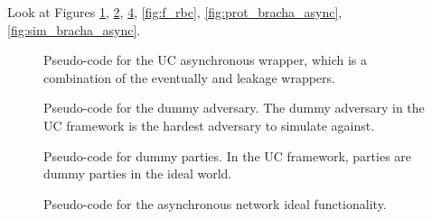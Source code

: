 %


Look at Figures \ref{fig:wrapper_async_new}, \ref{fig:dummy_adversary}, \ref{fig:f_async_explicit}, \ref{fig:f_rbc}, \ref{fig:prot_bracha_async}, \ref{fig:sim_bracha_async}.

\begin{figure}[h]
\centering
	
	\caption{Pseudo-code for the UC asynchronous wrapper, which is a combination of the eventually and leakage wrappers.}
	\label{fig:wrapper_async_new}
\end{figure}

\begin{figure}[h]
\centering
	
	\caption{Pseudo-code for the dummy adversary. The dummy adversary in the UC framework is the hardest adversary to simulate against.}
	\label{fig:dummy_adversary}
\end{figure}

\begin{figure}[h]
\centering
	
	\caption{Pseudo-code for dummy parties. In the UC framework, parties are dummy parties in the ideal world.}
	\label{fig:dummy_party}
\end{figure}

\begin{figure}[h]
\centering
	
	\caption{Pseudo-code for the asynchronous network ideal functionality.}
	\label{fig:f_async_explicit}
\end{figure}


